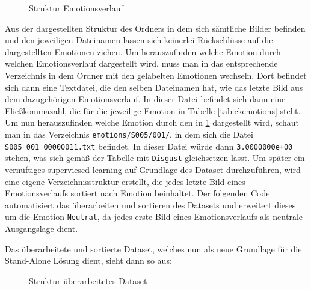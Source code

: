 \documentclass[12pt, a4paper]{report}
\begin{document}
\begin{figure}
\caption{Struktur Emotionsverlauf}
\label{fig:Tree Emotionsverlauf}
\end{figure}
Aus der dargestellten Struktur des Ordners in dem sich sämtliche Bilder befinden und den jeweiligen Dateinamen lassen sich keinerlei Rückschlüsse auf die dargestellten Emotionen ziehen. Um herauszufinden welche Emotion durch welchen Emotionsverlauf dargestellt wird, muss man in das entsprechende Verzeichnis in dem Ordner mit den gelabelten Emotionen wechseln. Dort befindet sich dann eine Textdatei, die den selben Dateinamen hat, wie das letzte Bild aus dem dazugehörigen Emotionsverlauf. In dieser Datei befindet sich dann eine Fließkommazahl, die für die jeweilige Emotion in Tabelle \ref{tab:ckemotions} steht. Um nun herauszufinden welche Emotion durch den in \ref{fig:Tree Emotionsverlauf} dargestellt wird, schaut man in das Verzeichnis \texttt{emotions/S005/001/}, in dem sich die Datei \texttt{S005\_001\_00000011.txt} befindet. In dieser Datei würde dann \texttt{3.0000000e+00} stehen, was sich gemäß der Tabelle mit \texttt{Disgust} gleichsetzen lässt.\newline
Um später ein vernüftiges superviesed learning auf Grundlage des Dataset durchzuführen, wird eine eigene Verzeichnisstruktur erstellt, die jedes letzte Bild eines Emotionsverlaufs sortiert nach Emotion beinhaltet. Der folgenden Code automatisiert das überarbeiten und sortieren des Datasets und erweitert dieses um die Emotion \texttt{Neutral}, da jedes erste Bild eines Emotionsverlaufs als neutrale Ausgangslage dient.

Das überarbeitete und sortierte Dataset, welches nun als neue Grundlage für die Stand-Alone Lösung dient, sieht dann so aus:
\begin{figure}
\caption{Struktur überarbeitetes Dataset}
\label{fig:Tree Sorted Set}
\end{figure}
\end{document}
